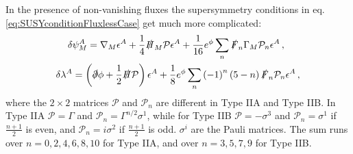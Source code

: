 \documentclass[12pt,a4paper]{book}
\begin{document}
In the presence of non-vanishing fluxes the supersymmetry conditions in eq. \eqref{eq:SUSYconditionFluxlessCase} get much more complicated:
\begin{align}
\label{eq:SUSYConditionsWithFluxes}
\delta& \psi_M^A = \nabla_M \epsilon^A + \frac{1}{4} \slashed{H}_M \mathcal{P} \epsilon^A + \frac{1}{16} e^{\phi} \sum_n \slashed{F}_n \Gamma_M  \mathcal{P}_n \epsilon^A \,, \nonumber \\
\delta \lambda^A &= \left(\slashed{\partial} \phi + \frac{1}{2} \slashed{H} \mathcal{P}\right) \epsilon^A + \frac{1}{8} e^{\phi} \sum_n \left(-1\right)^n \left(5 - n\right) \slashed{F}_n \mathcal{P}_n \epsilon^A \,,
\end{align}
where the $2 \times 2$ matrices $\mathcal{P}$ and $\mathcal{P}_n$ are different in Type IIA and Type IIB. In Type IIA $\mathcal{P} = \Gamma$ and $\mathcal{P}_n = \Gamma^{n/2} \sigma^1$, while for Type IIB $\mathcal{P} = - \sigma^3$ and $\mathcal{P}_n = \sigma^1$ if $\frac{n + 1}{2}$ is even, and $\mathcal{P}_n = i\sigma^2$ if $\frac{n + 1}{2}$ is odd. $\sigma^i$ are the Pauli matrices. The sum runs over $n = 0, 2, 4, 6, 8, 10$ for Type IIA, and over $n = 3, 5, 7 , 9$ for Type IIB.\\
\end{document}
